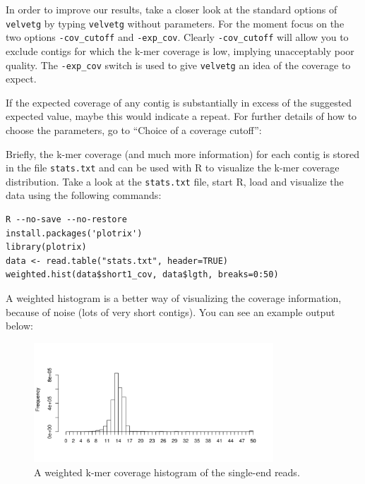 \begin{information}
In order to improve our results, take a closer look at the standard options of
\texttt{velvetg} by typing \texttt{velvetg} without parameters. For the moment
focus on the two options \texttt{-cov\_cutoff} and \texttt{-exp\_cov}. Clearly
\texttt{-cov\_cutoff} will allow you to exclude contigs for which the k-mer
coverage is low, implying unacceptably poor quality.
The \texttt{-exp\_cov} switch is used to give \texttt{velvetg} an idea of the
coverage to expect.

If the expected coverage of any contig is substantially in excess of the
suggested expected value, maybe this would indicate a repeat. For further
details of how to choose the parameters, go to ``Choice of a coverage cutoff'':


\end{information}

\begin{steps}
Briefly, the k-mer coverage (and much more information) for each contig is stored
in the file \texttt{stats.txt} and can be used with R to visualize the k-mer coverage
distribution. Take a look at the \texttt{stats.txt} file, start R, load and
visualize the data using the following commands:
\begin{lstlisting}[style=R]
R --no-save --no-restore
install.packages('plotrix')
library(plotrix)
data <- read.table("stats.txt", header=TRUE)
weighted.hist(data$short1_cov, data$lgth, breaks=0:50)
\end{lstlisting}

A weighted histogram is a better way of visualizing the coverage information,
because of noise (lots of very short contigs). You can see an example output
below:
\end{steps}

\begin{figure}[H]
\centering
\includegraphics[width=0.8\textwidth]{de_novo/velvet/velvet_Rplot001.png}
\caption{\label{fig:SRS004748_coverage_hist} A weighted k-mer coverage histogram of the single-end reads.}
\end{figure}

